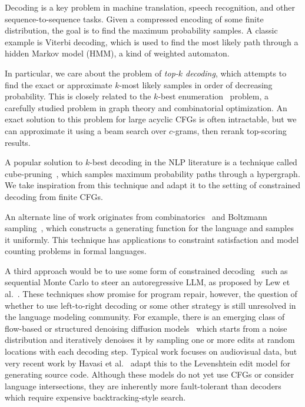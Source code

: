 \documentclass[sigplan,acmsmall,nonacm,screen]{acmart}\settopmatter{printfolios=false,printccs=false,printacmref=false}
\begin{document}
Decoding is a key problem in machine translation, speech recognition, and other sequence-to-sequence tasks. Given a compressed encoding of some finite distribution, the goal is to find the maximum probability samples. A classic example is Viterbi decoding, which is used to find the most likely path through a hidden Markov model (HMM), a kind of weighted automaton.

In particular, we care about the problem of \textit{top-$k$ decoding}, which attempts to find the exact or approximate $k$-most likely samples in order of decreasing probability. This is closely related to the $k$-best enumeration~\cite{eppstein2014k} problem, a carefully studied problem in graph theory and combinatorial optimization. An exact solution to this problem for large acyclic CFGs is often intractable, but we can approximate it using a beam search over $c$-grams, then rerank top-scoring results.

A popular solution to $k$-best decoding in the NLP literature is a technique called cube-pruning~\cite{huang2005better, chiang2007hierarchical}, which samples maximum probability paths through a hypergraph. We take inspiration from this technique and adapt it to the setting of constrained decoding from finite CFGs.

An alternate line of work originates from combinatorics~\cite{hickey1983uniform} and Boltzmann sampling~\cite{duchon2004boltzmann}, which constructs a generating function for the language and samples it uniformly. This technique has applications to constraint satisfaction and model counting problems in formal languages.

A third approach would be to use some form of constrained decoding~\cite{willard2023efficient, ugare2024improving, loula2025syntactic} such as sequential Monte Carlo to steer an autoregressive LLM, as proposed by Lew et al.~\cite{lew2023sequential}. These techniques show promise for program repair, however, the question of whether to use left-to-right decoding or some other strategy is still unresolved in the language modeling community. For example, there is an emerging class of flow-based or structured denoising diffusion models~\cite{austin2021structured} which starts from a noise distribution and iteratively denoises it by sampling one or more edits at random locations with each decoding step. Typical work focuses on audiovisual data, but very recent work by Havasi et al.~\cite{havasi2025edit} adapt this to the Levenshtein edit model for generating source code. Although these models do not yet use CFGs or consider language intersections, they are inherently more fault-tolerant than decoders which require expensive backtracking-style search.
\end{document}
